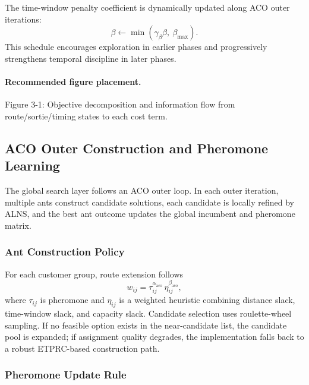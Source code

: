\documentclass[review,12pt]{elsarticle}
\begin{document}
The time-window penalty coefficient is dynamically updated along ACO outer iterations:
\begin{equation}
\beta \leftarrow \min\left(\gamma_\beta \beta,\ \beta_{\max}\right).
\label{eq:beta_schedule}
\end{equation}
This schedule encourages exploration in earlier phases and progressively strengthens temporal discipline in later phases.

\paragraph{Recommended figure placement.}
Figure 3-1: Objective decomposition and information flow from route/sortie/timing states to each cost term.

\subsection{ACO Outer Construction and Pheromone Learning}
\label{subsec:aco_outer}

The global search layer follows an ACO outer loop. In each outer iteration, multiple ants construct candidate solutions, each candidate is locally refined by ALNS, and the best ant outcome updates the global incumbent and pheromone matrix.

\subsubsection{Ant Construction Policy}

For each customer group, route extension follows
\begin{equation}
w_{ij} = \tau_{ij}^{\alpha_{\mathrm{aco}}}\,\eta_{ij}^{\beta_{\mathrm{aco}}},
\label{eq:transition_weight}
\end{equation}
where \(\tau_{ij}\) is pheromone and \(\eta_{ij}\) is a weighted heuristic combining distance slack, time-window slack, and capacity slack. Candidate selection uses roulette-wheel sampling. If no feasible option exists in the near-candidate list, the candidate pool is expanded; if assignment quality degrades, the implementation falls back to a robust ETPRC-based construction path.

\subsubsection{Pheromone Update Rule}
\end{document}
